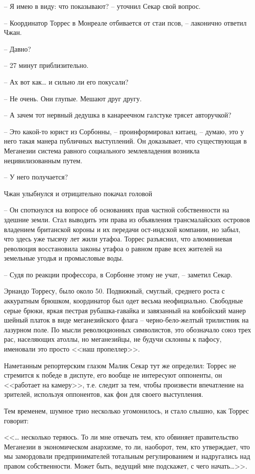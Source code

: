 -- Я имею в виду: что показывают? -- уточнил Секар свой вопрос.

-- Координатор Торрес в Монреале отбивается от стаи псов, -- лаконично ответил Чжан.

-- Давно?

-- 27 минут приблизительно.

-- Ах вот как\ldots{} и сильно ли его покусали?

-- Не очень. Они глупые. Мешают друг другу.

-- А зачем тот нервный дедушка в канареечном галстуке трясет авторучкой?

-- Это какой-то юрист из Сорбонны, -- проинформировал китаец, -- думаю, это у него такая манера публичных выступлений. Он доказывает, что существующая в Меганезии система равного социального землевладения возникла нецивилизованным путем.

-- У него получается?

Чжан улыбнулся и отрицательно покачал головой

-- Он споткнулся на вопросе об основаниях прав частной собственности на здешние земли. Стал выводить эти права из объявления трансмалайских островов владением британской короны и их передачи ост-индской компании, но забыл, что здесь уже тысячу лет жили утафоа. Торрес разъяснил, что алюминиевая революция восстановила законы утафоа о равном праве всех жителей на земельные угодья и промысловые воды.

-- Судя по реакции профессора, в Сорбонне этому не учат, -- заметил Секар.

Эрнандо Торресу, было около 50. Подвижный, смуглый, среднего роста с аккуратным брюшком, координатор был одет весьма неофициально. Свободные серые брюки, яркая пестрая рубашка-гавайка и завязанный на ковбойский манер шейный платок в виде меганезийского флага -- черно-бело-желтый трилистник на лазурном поле. По мысли революционных символистов, это обозначало союз трех рас, населяющих атоллы, но меганезийцы, не будучи склонны к пафосу, именовали это просто <<наш пропеллер>>.

Наметанным репортерским глазом Малик Секар тут же определил: Торрес не стремится к победе в диспуте, его вообще не интересуют оппоненты, он <<работает на камеру>>, т.е. следит за тем, чтобы произвести впечатление на зрителей, используя оппонентов, как фон для своего выступления.

Тем временем, шумное трио несколько угомонилось, и стало слышно, как Торрес говорит:

<<\ldots{} несколько теряюсь. То ли мне отвечать тем, кто обвиняет правительство Меганезии в экономическом анархизме, то ли, наоборот, тем, кто утверждает, что мы замордовали предпринимателей тотальным регулированием и надругались над правом собственности. Может быть, ведущий мне подскажет, с чего начать\ldots{}>>.

